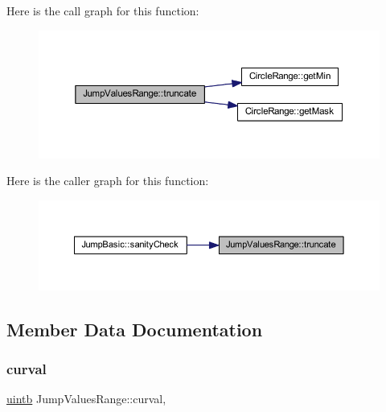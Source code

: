 Here is the call graph for this function\+:
\nopagebreak
\begin{figure}[H]
\begin{center}
\leavevmode
\includegraphics[width=350pt]{class_jump_values_range_a7db1100f69820afdec9f6bfef09db8b1_cgraph}
\end{center}
\end{figure}
Here is the caller graph for this function\+:
\nopagebreak
\begin{figure}[H]
\begin{center}
\leavevmode
\includegraphics[width=350pt]{class_jump_values_range_a7db1100f69820afdec9f6bfef09db8b1_icgraph}
\end{center}
\end{figure}


\subsection{Member Data Documentation}
\mbox{\label{class_jump_values_range_a15d3ab3bdb44c4d833a70245dad8eb60}} 
\subsubsection{\texorpdfstring{curval}{curval}}
{\footnotesize\ttfamily \mbox{\hyperlink{types_8h_a2db313c5d32a12b01d26ac9b3bca178f}{uintb}} Jump\+Values\+Range\+::curval\hspace{0.3cm}{\ttfamily [mutable]}, {\ttfamily [protected]}}



